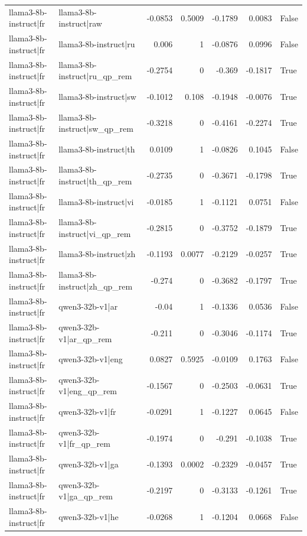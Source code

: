 \begin{table}
\begin{tabular}{l l r r r r l}
llama3-8b-instruct|fr & llama3-8b-instruct|raw & -0.0853 & 0.5009 & -0.1789 & 0.0083 & False \\
llama3-8b-instruct|fr & llama3-8b-instruct|ru & 0.006 & 1 & -0.0876 & 0.0996 & False \\
llama3-8b-instruct|fr & llama3-8b-instruct|ru_qp_rem & -0.2754 & 0 & -0.369 & -0.1817 & True \\
llama3-8b-instruct|fr & llama3-8b-instruct|sw & -0.1012 & 0.108 & -0.1948 & -0.0076 & True \\
llama3-8b-instruct|fr & llama3-8b-instruct|sw_qp_rem & -0.3218 & 0 & -0.4161 & -0.2274 & True \\
llama3-8b-instruct|fr & llama3-8b-instruct|th & 0.0109 & 1 & -0.0826 & 0.1045 & False \\
llama3-8b-instruct|fr & llama3-8b-instruct|th_qp_rem & -0.2735 & 0 & -0.3671 & -0.1798 & True \\
llama3-8b-instruct|fr & llama3-8b-instruct|vi & -0.0185 & 1 & -0.1121 & 0.0751 & False \\
llama3-8b-instruct|fr & llama3-8b-instruct|vi_qp_rem & -0.2815 & 0 & -0.3752 & -0.1879 & True \\
llama3-8b-instruct|fr & llama3-8b-instruct|zh & -0.1193 & 0.0077 & -0.2129 & -0.0257 & True \\
llama3-8b-instruct|fr & llama3-8b-instruct|zh_qp_rem & -0.274 & 0 & -0.3682 & -0.1797 & True \\
llama3-8b-instruct|fr & qwen3-32b-v1|ar & -0.04 & 1 & -0.1336 & 0.0536 & False \\
llama3-8b-instruct|fr & qwen3-32b-v1|ar_qp_rem & -0.211 & 0 & -0.3046 & -0.1174 & True \\
llama3-8b-instruct|fr & qwen3-32b-v1|eng & 0.0827 & 0.5925 & -0.0109 & 0.1763 & False \\
llama3-8b-instruct|fr & qwen3-32b-v1|eng_qp_rem & -0.1567 & 0 & -0.2503 & -0.0631 & True \\
llama3-8b-instruct|fr & qwen3-32b-v1|fr & -0.0291 & 1 & -0.1227 & 0.0645 & False \\
llama3-8b-instruct|fr & qwen3-32b-v1|fr_qp_rem & -0.1974 & 0 & -0.291 & -0.1038 & True \\
llama3-8b-instruct|fr & qwen3-32b-v1|ga & -0.1393 & 0.0002 & -0.2329 & -0.0457 & True \\
llama3-8b-instruct|fr & qwen3-32b-v1|ga_qp_rem & -0.2197 & 0 & -0.3133 & -0.1261 & True \\
llama3-8b-instruct|fr & qwen3-32b-v1|he & -0.0268 & 1 & -0.1204 & 0.0668 & False \\

\end{tabular}
\end{table}
